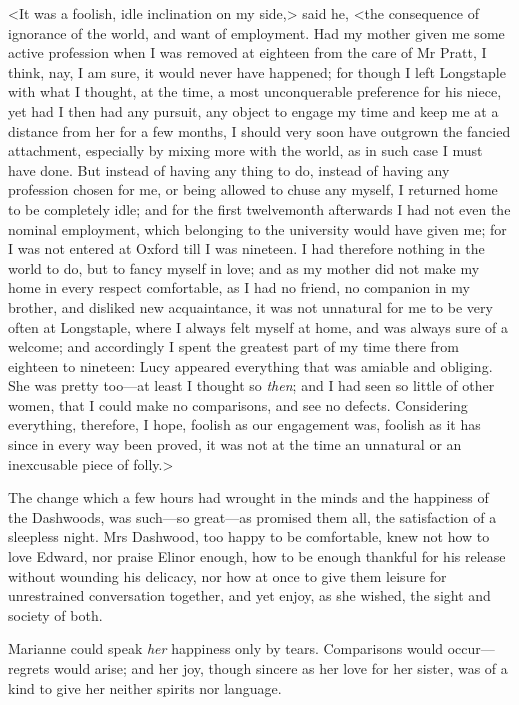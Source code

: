 <It was a foolish, idle inclination on my side,> said he, <the consequence of ignorance of the world, and want of employment. Had my mother given me some active profession when I was removed at eighteen from the care of Mr Pratt, I think, nay, I am sure, it would never have happened; for though I left Longstaple with what I thought, at the time, a most unconquerable preference for his niece, yet had I then had any pursuit, any object to engage my time and keep me at a distance from her for a few months, I should very soon have outgrown the fancied attachment, especially by mixing more with the world, as in such case I must have done. But instead of having any thing to do, instead of having any profession chosen for me, or being allowed to chuse any myself, I returned home to be completely idle; and for the first twelvemonth afterwards I had not even the nominal employment, which belonging to the university would have given me; for I was not entered at Oxford till I was nineteen. I had therefore nothing in the world to do, but to fancy myself in love; and as my mother did not make my home in every respect comfortable, as I had no friend, no companion in my brother, and disliked new acquaintance, it was not unnatural for me to be very often at Longstaple, where I always felt myself at home, and was always sure of a welcome; and accordingly I spent the greatest part of my time there from eighteen to nineteen: Lucy appeared everything that was amiable and obliging. She was pretty too—at least I thought so \textit{then}; and I had seen so little of other women, that I could make no comparisons, and see no defects. Considering everything, therefore, I hope, foolish as our engagement was, foolish as it has since in every way been proved, it was not at the time an unnatural or an inexcusable piece of folly.>

The change which a few hours had wrought in the minds and the happiness of the Dashwoods, was such—so great—as promised them all, the satisfaction of a sleepless night. Mrs Dashwood, too happy to be comfortable, knew not how to love Edward, nor praise Elinor enough, how to be enough thankful for his release without wounding his delicacy, nor how at once to give them leisure for unrestrained conversation together, and yet enjoy, as she wished, the sight and society of both.

Marianne could speak \textit{her} happiness only by tears. Comparisons would occur—regrets would arise; and her joy, though sincere as her love for her sister, was of a kind to give her neither spirits nor language.

